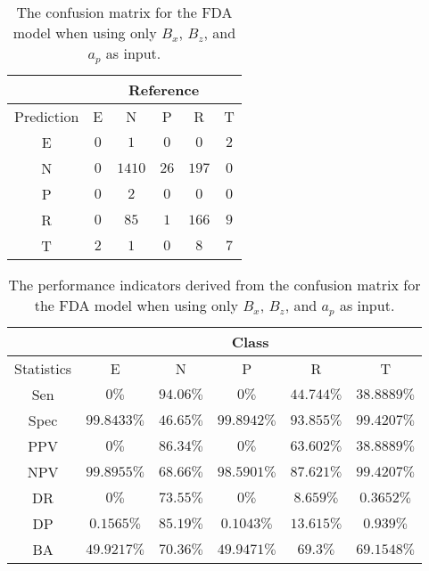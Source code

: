 \begin{table}[!ht]
	\centering
	\begin{tabular}{|c|c|c|c|c|c|}
		\hline
		 & \multicolumn{5}{|c|}{Reference} \\ \hline
		 Prediction & E & N & P & R & T \\ \hline
		 E & $0$ & $1$ & $0$ & $0$ & $2$ \\ \hline
		 N & $0$ & $1410$ & $26$ & $197$ & $0$ \\ \hline
		 P & $0$ & $2$ & $0$ & $0$ & $0$ \\ \hline
		 R & $0$ & $85$ & $1$ & $166$ & $9$ \\ \hline
		 T & $2$ & $1$ & $0$ & $8$ & $7$ \\ \hline
	\end{tabular}
	\caption{The confusion matrix for the FDA model when using only $B_{x}$, $B_{z}$, and $a_{p}$ as input.}
	\label{tab:cm:xzap:fda}
\end{table}

\begin{table}[!ht]
	\centering
	\begin{tabular}{|c|c|c|c|c|c|}
		\hline
		 & \multicolumn{5}{c|}{Class} \\ \hline
		Statistics & E & N & P & R & T \\ \hline
		Sen & $0\%$ & $94.06\%$ & $0\%$ & $44.744\%$ & $38.8889\%$ \\ \hline
		Spec & $99.8433\%$ & $46.65\%$ & $99.8942\%$ & $93.855\%$ & $99.4207\%$ \\ \hline
		PPV & $0\%$ & $86.34\%$ & $0\%$ & $63.602\%$ & $38.8889\%$ \\ \hline
		NPV & $99.8955\%$ & $68.66\%$ & $98.5901\%$ & $87.621\%$ & $99.4207\%$ \\ \hline
		DR & $0\%$ & $73.55\%$ & $0\%$ & $8.659\%$ & $0.3652\%$ \\ \hline
		DP & $0.1565\%$ & $85.19\%$ & $0.1043\%$ & $13.615\%$ & $0.939\%$ \\ \hline
		BA & $49.9217\%$ & $70.36\%$ & $49.9471\%$ & $69.3\%$ & $69.1548\%$ \\ \hline
	\end{tabular}
	\caption{The performance indicators derived from the confusion matrix for the FDA model when using only $B_{x}$, $B_{z}$, and $a_{p}$ as input.}
	\label{tab:cs:reverse:xzap:fda}
\end{table}
